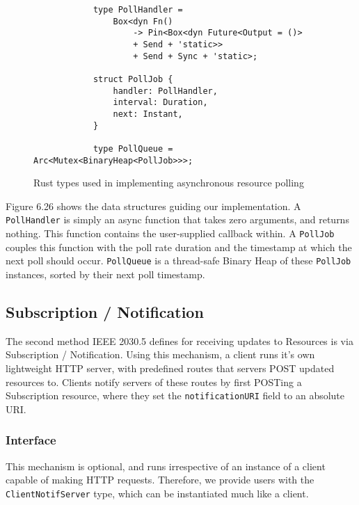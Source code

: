 \begin{figure}[h]
    \begin{center}
        \begin{lstlisting}
            type PollHandler =
                Box<dyn Fn() 
                    -> Pin<Box<dyn Future<Output = ()> 
                    + Send + 'static>> 
                    + Send + Sync + 'static>;

            struct PollJob {
                handler: PollHandler,
                interval: Duration,
                next: Instant,
            }

            type PollQueue = Arc<Mutex<BinaryHeap<PollJob>>>;

        \end{lstlisting}
        \label{fig:pollimplds}
        \vspace{-10pt}
        \caption{Rust types used in implementing asynchronous resource polling}
    \end{center}
\end{figure}

Figure 6.26 shows the data structures guiding our implementation. A \texttt{PollHandler} is simply an async function that takes zero arguments, and returns nothing. This function contains the user-supplied callback within. A \texttt{PollJob} couples this function with the poll rate duration and the timestamp at which the next poll should occur.
\texttt{PollQueue} is a thread-safe Binary Heap of these \texttt{PollJob} instances, sorted by their next poll timestamp.


\subsection{Subscription / Notification}
The second method IEEE 2030.5 defines for receiving updates to Resources is via Subscription / Notification.
Using this mechanism, a client runs it's own lightweight HTTP server, with predefined routes that servers POST updated resources to. Clients notify servers of these routes by first POSTing a Subscription resource, where they set the \texttt{notificationURI} field to an absolute URI.

\subsubsection{Interface}
This mechanism is optional, and runs irrespective of an instance of a client capable of making HTTP requests. Therefore, we provide users with the \texttt{ClientNotifServer} type, which can be instantiated much like a client.

